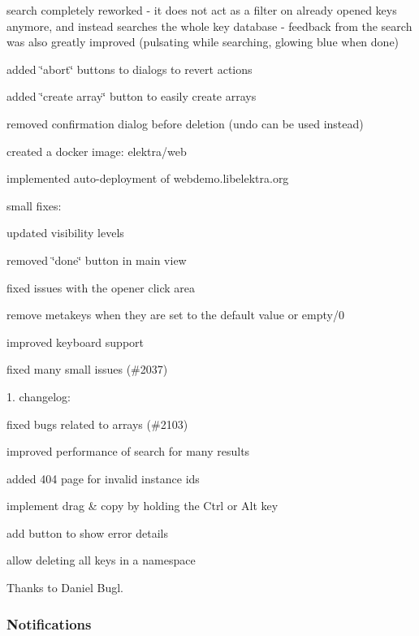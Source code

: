 \begin{DoxyItemize}
\item search completely reworked -\/ it does not act as a filter on already opened keys anymore, and instead searches the whole key database -\/ feedback from the search was also greatly improved (pulsating while searching, glowing blue when done)
\item added \char`\"{}abort\char`\"{} buttons to dialogs to revert actions
\item added \char`\"{}create array\char`\"{} button to easily create arrays
\item removed confirmation dialog before deletion (undo can be used instead)
\item created a docker image\+: {\ttfamily elektra/web}
\item implemented auto-\/deployment of webdemo.\+libelektra.\+org
\item small fixes\+:
\begin{DoxyItemize}
\item updated visibility levels
\item removed \char`\"{}done\char`\"{} button in main view
\item fixed issues with the opener click area
\item remove metakeys when they are set to the default value or empty/0
\item improved keyboard support
\item fixed many small issues (\#2037)
\end{DoxyItemize}
\end{DoxyItemize}

1. changelog\+:


\begin{DoxyItemize}
\item fixed bugs related to arrays (\#2103)
\item improved performance of search for many results
\item added 404 page for invalid instance ids
\item implement drag \& copy by holding the Ctrl or Alt key
\item add button to show error details
\item allow deleting all keys in a namespace
\end{DoxyItemize}

Thanks to Daniel Bugl.

\subsubsection*{Notifications}

